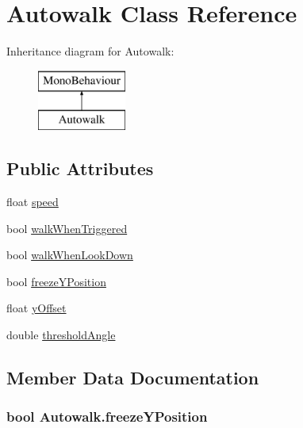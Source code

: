 \hypertarget{class_autowalk}{}\section{Autowalk Class Reference}
\label{class_autowalk}
Inheritance diagram for Autowalk\+:\begin{figure}[H]
\begin{center}
\leavevmode
\includegraphics[height=2.000000cm]{class_autowalk}
\end{center}
\end{figure}
\subsection*{Public Attributes}
\begin{DoxyCompactItemize}
\item 
float \hyperlink{class_autowalk_a3092a4d8988a54c5774865800cef6c22}{speed}
\item 
bool \hyperlink{class_autowalk_ac644a9b75f6f5ace1155fd461ba7afc5}{walk\+When\+Triggered}
\item 
bool \hyperlink{class_autowalk_aa93343a7a4e1f3884c91cbbe7cdfea1f}{walk\+When\+Look\+Down}
\item 
bool \hyperlink{class_autowalk_afb9baa3b1db7ced136fc83fca8a40f9a}{freeze\+Y\+Position}
\item 
float \hyperlink{class_autowalk_a65b75b93ffed0edfd3fdf00b2f03fcc6}{y\+Offset}
\item 
double \hyperlink{class_autowalk_a88a1c42da0a6619e6f5540b1ff823e2a}{threshold\+Angle}
\end{DoxyCompactItemize}


\subsection{Member Data Documentation}
\hypertarget{class_autowalk_afb9baa3b1db7ced136fc83fca8a40f9a}{}
\subsubsection[{freeze\+Y\+Position}]{\setlength{\rightskip}{0pt plus 5cm}bool Autowalk.\+freeze\+Y\+Position}\label{class_autowalk_afb9baa3b1db7ced136fc83fca8a40f9a}
\hypertarget{class_autowalk_a3092a4d8988a54c5774865800cef6c22}{}
